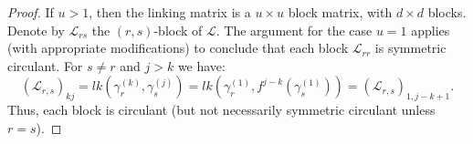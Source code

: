 \documentclass[11pt]{amsart}
\begin{document}
\begin{proof}
If $u>1$, then the linking matrix is a $u\times u$ block matrix, with $d\times d$ blocks. Denote by $\mathcal{L}_{rs}$ the $(r,s)$-block of $\mathcal{L}$. The argument for the case $u=1$ applies (with appropriate modifications) to conclude that each block $\mathcal{L}_{rr}$ is symmetric circulant. For $s\neq r$ and $j>k$ we have:
$$\left(\mathcal{L}_{r,s }\right)_{kj}=lk\left(\gamma_r^{(k)},\gamma_s^{(j)}\right)=lk\left(\gamma_r^{(1)},f^{j-k}\left(\gamma_s^{(1)}\right)\right)=\left(\mathcal{L}_{r,s }\right)_{1, j-k+1}.$$
Thus, each block is circulant (but not necessarily symmetric circulant unless $r=s$).

\end{proof}

\end{document}
